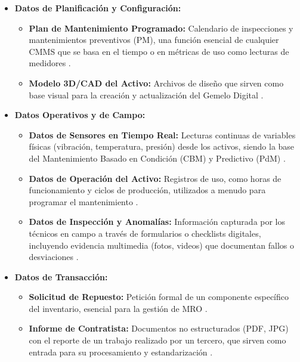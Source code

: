 \begin{itemize}
    \item \textbf{Datos de Planificación y Configuración:}
    \begin{itemize}
        \item \textbf{Plan de Mantenimiento Programado:} Calendario de inspecciones y mantenimientos preventivos (PM), una función esencial de cualquier CMMS que se basa en el tiempo o en métricas de uso como lecturas de medidores \parencite{accruent:2025, ftmaintenance:2019, laurila:2017}.
        \item \textbf{Modelo 3D/CAD del Activo:} Archivos de diseño que sirven como base visual para la creación y actualización del Gemelo Digital \parencite{miao:2025, zhang:2025}.
    \end{itemize}
    \item \textbf{Datos Operativos y de Campo:}
    \begin{itemize}
        \item \textbf{Datos de Sensores en Tiempo Real:} Lecturas continuas de variables físicas (vibración, temperatura, presión) desde los activos, siendo la base del Mantenimiento Basado en Condición (CBM) y Predictivo (PdM) \parencite{chen:2025, mrzyk:2023, osullivan:2020, sap:sf}.
        \item \textbf{Datos de Operación del Activo:} Registros de uso, como horas de funcionamiento y ciclos de producción, utilizados a menudo para programar el mantenimiento \parencite{laurila:2017, manwinwin:2015, osullivan:2020}.
        \item \textbf{Datos de Inspección y Anomalías:} Información capturada por los técnicos en campo a través de formularios o checklists digitales, incluyendo evidencia multimedia (fotos, videos) que documentan fallos o desviaciones \parencite{fracttal:2024, ftmaintenance:2019, servicenow:sf}.
    \end{itemize}
    \item \textbf{Datos de Transacción:}
    \begin{itemize}
        \item \textbf{Solicitud de Repuesto:} Petición formal de un componente específico del inventario, esencial para la gestión de MRO \parencite{hxgn:sf, stum:2018}.
        \item \textbf{Informe de Contratista:} Documentos no estructurados (PDF, JPG) con el reporte de un trabajo realizado por un tercero, que sirven como entrada para su procesamiento y estandarización \parencite{hxgn:sf, zhang:2025}.
    \end{itemize}
\end{itemize}

